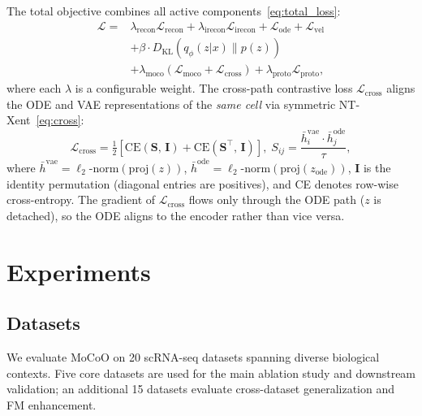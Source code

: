 \documentclass[journal]{IEEEtran}
\begin{document}
The total objective combines all active components~\eqref{eq:total_loss}:
\begin{align}
    \mathcal{L} ={} & \lambda_{\mathrm{recon}} \mathcal{L}_{\mathrm{recon}} + \lambda_{\mathrm{irecon}} \mathcal{L}_{\mathrm{irecon}} + \mathcal{L}_{\mathrm{ode}} + \mathcal{L}_{\mathrm{vel}} \nonumber \\
    & + \beta \cdot D_{\mathrm{KL}}(q_\phi(z|x) \| p(z)) \nonumber \\
    & + \lambda_{\mathrm{moco}} (\mathcal{L}_{\mathrm{moco}} + \mathcal{L}_{\mathrm{cross}}) + \lambda_{\mathrm{proto}} \mathcal{L}_{\mathrm{proto}},
    \label{eq:total_loss}
\end{align}
where each $\lambda$ is a configurable weight. The cross-path contrastive loss $\mathcal{L}_{\mathrm{cross}}$ aligns the ODE and VAE representations of the \emph{same cell} via symmetric NT-Xent~\eqref{eq:cross}:
\begin{equation}
    \mathcal{L}_{\mathrm{cross}} = \tfrac{1}{2}\!\left[\mathrm{CE}(\mathbf{S},\,\mathbf{I}) + \mathrm{CE}(\mathbf{S}^{\!\top}\!,\,\mathbf{I})\right],\;
    S_{ij} = \frac{\bar{h}^{\mathrm{vae}}_i \cdot \bar{h}^{\mathrm{ode}}_j}{\tau},
    \label{eq:cross}
\end{equation}
where $\bar{h}^{\mathrm{vae}} = \ell_2\text{-norm}(\mathrm{proj}(z))$, $\bar{h}^{\mathrm{ode}} = \ell_2\text{-norm}(\mathrm{proj}(z_{\mathrm{ode}}))$, $\mathbf{I}$ is the identity permutation (diagonal entries are positives), and CE denotes row-wise cross-entropy. The gradient of $\mathcal{L}_{\mathrm{cross}}$ flows only through the ODE path ($z$ is detached), so the ODE aligns to the encoder rather than vice versa.

\section{Experiments}
\label{sec:experiments}

\subsection{Datasets}
\label{sec:experiments:datasets}

We evaluate MoCoO on 20 scRNA-seq datasets spanning diverse biological contexts. Five core datasets are used for the main ablation study and downstream validation; an additional 15 datasets evaluate cross-dataset generalization and FM enhancement.
\end{document}
